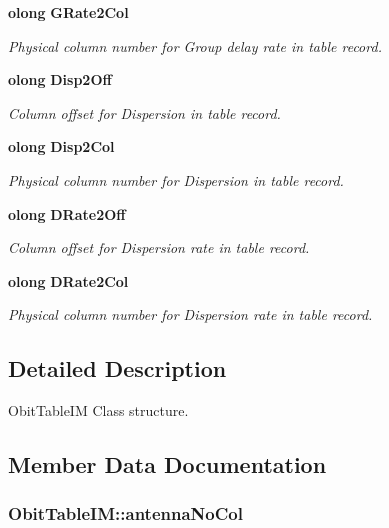 \begin{CompactItemize}
{\bf olong} {\bf GRate2Col}
\begin{CompactList}\small\item\em Physical column number for Group delay rate in table record. \item\end{CompactList}\item 
{\bf olong} {\bf Disp2Off}
\begin{CompactList}\small\item\em Column offset for Dispersion in table record. \item\end{CompactList}\item 
{\bf olong} {\bf Disp2Col}
\begin{CompactList}\small\item\em Physical column number for Dispersion in table record. \item\end{CompactList}\item 
{\bf olong} {\bf DRate2Off}
\begin{CompactList}\small\item\em Column offset for Dispersion rate in table record. \item\end{CompactList}\item 
{\bf olong} {\bf DRate2Col}
\begin{CompactList}\small\item\em Physical column number for Dispersion rate in table record. \item\end{CompactList}\end{CompactItemize}


\subsection{Detailed Description}
Obit\-Table\-IM Class structure. 



\subsection{Member Data Documentation}
\subsubsection{ {\bf Obit\-Table\-IM::antenna\-No\-Col}}\label{structObitTableIM_o34}


